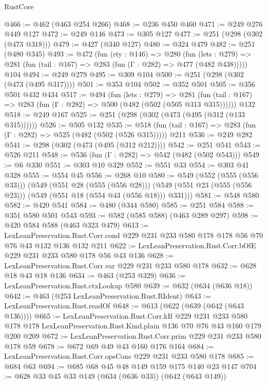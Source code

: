 \begin{lexlean}{RustCore}
\begin{coremodule}
@466 := @462 (@463 @254 @266)
@468 := @236 @450 @460
@471 := @249 @276 @449 @127
@472 := @249 @146
@473 := @305 @127
@477 := @251 (@298 (@302 (@473 @318)))
@479 := @427 (@340 @127)
@480 := @324 @479
@482 := @251 (@480 @345)
@493 := @472
    (fun (rty : @146) =>
    @280
      (fun (lets : @279) => @281 (fun (tail : @167) => @283 (fun (Γ : @282) => @477 (@482 @438)))))
    @104
@494 := @249 @279
@495 := @309 @104
@500 := @251 (@298 (@302 (@473 (@495 @317))))
@501 := @353 @104
@502 := @352 @501
@505 := @356 @501 @432 @434
@517 := @494
    (fun (lets : @279) =>
    @281 (fun (tail : @167) => @283 (fun (Γ : @282) => @500 (@482 (@502 (@505 @313 @315))))))
    @132
@518 := @249 @167
@525 := @251 (@298 (@302 (@473 (@495 (@312 (@133 @315))))))
@526 := @505 @132
@535 := @518 (fun (tail : @167) => @283 (fun (Γ : @282) => @525 (@482 (@502 (@526 @315))))) @211
@536 := @249 @282
@541 := @298 (@302 (@473 (@495 (@312 @212))))
@542 := @251 @541
@543 := @526 @211
@548 := @536 (fun (Γ : @282) => @542 (@482 (@502 @543)))
@549 := @6 @330
@551 := @303 @10 @329
@552 := @551 @33
@554 := @303 @41 @328
@555 := @554 @45
@556 := @268 @10
@580 := @549
    (@552 (@555 (@556 @33)))
    (@549
      (@551 @28 (@555 (@556 @28)))
      (@549 (@551 @23 (@555 (@556 @23))) (@549 (@551 @18 (@554 @43 (@556 @18))) @331)))
@581 := @548 @580
@582 := @420 @541
@584 := @480 (@344 @580)
@585 := @251 @584
@588 := @351 @580 @501 @543
@593 := @582 (@585 @588) (@463 @289 @297)
@598 := @420 @584 @588 (@463 @323 @479)
@613 := LexLeanPreservation.Rust.Corr.cond
    @229
    @231
    @233
    @580
    @178
    @178
    @56
    @70
    @76
    @43
    @132
    @136
    @132
    @211
@622 := LexLeanPreservation.Rust.Corr.bOfE @229 @231 @233 @580 @178 @56 @43 @136
@628 := LexLeanPreservation.Rust.Corr.var @229 @231 @233 @580 @178
@632 := @628 @18 @43 @18 @136
@634 := @463 (@253 @329)
@636 := LexLeanPreservation.Rust.ctxLookup @580
@639 := @632 (@634 (@636 @18))
@642 := @463 (@253 LexLeanPreservation.Rust.RIdent)
@643 := LexLeanPreservation.Rust.readOf
@648 := @613 (@622 (@639 (@642 (@643 @136))))
@665 := LexLeanPreservation.Rust.Corr.kIf
    @229
    @231
    @233
    @580
    @178
    @178
    LexLeanPreservation.Rust.Kind.plain
    @136
    @70
    @76
    @43
    @160
    @179
    @200
    @209
@672 := LexLeanPreservation.Rust.Corr.prim @229 @231 @233 @580 @178 @59
@678 := @672 @69 @49 @43 @160 @176 @164
@684 := LexLeanPreservation.Rust.Corr.opsCons @229 @231 @233 @580 @178
@685 := @684 @63
@694 := @685 @68 @45 @48 @149 @159 @175 @140 @23 @147
@704 := @628 @33 @45 @33 @149 (@634 (@636 @33)) (@642 (@643 @149))

\end{coremodule}
\end{lexlean}
